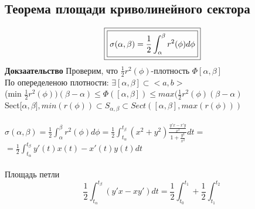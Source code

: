 \documentclass[12pt, a4paper]{article}
\begin{document}
 \subsection{Теорема площади криволинейного сектора}
 \[
    \boxed{\boxed{ \sigma(\alpha,\beta)=\frac{1}{2} \int_{\alpha}^{\beta}r^2(\phi) d\phi}}\\
\]
 \textbf{Докзаательство}
    Проверим, что $\frac{1}{2}r^2(\phi)$-плотность $\Phi[\alpha,\beta]$\\
     По опеределеною плотности: $\exists [\alpha, \beta] \subset <a,b>$ \\
    (min $\frac{1}{2}r^2(\phi))(\beta - \alpha) \leq  \Phi([\alpha,\beta])\leq max(\frac{1}{2}r^2(\phi)( \beta -    \alpha)$\\
     Sect[$ \alpha,\beta ], min(r( \phi )) \subset S_{ \alpha,\beta } \subset Sect([ \alpha,\beta ], max(r( \phi )))$\\
   \\
    $\sigma(\alpha,\beta)=\frac{1}{2} \int_{\alpha}^{\beta}r^2(\phi) d\phi = \frac{1}{2}\int_{t_\alpha}^{t_\beta}(x^2+y^2)\frac{\frac{y'x-x'y}{x^2}}{1+\frac{y^2}{x^2}}dt =$ \\
    $=\frac{1}{2}\int_{t_\alpha}^{t_\beta}y'(t)x(t)-x'(t)y(t) dt$ \\
   \\
     Площадь петли\\
   \[
    \boxed{\boxed{ \frac{1}{2} \int_{t_\alpha}^{t_\beta}( y'x-xy' ) dt = \frac{1}{2}\int_{t_0}^{t_1}+\frac{1}{2}\int_{t_1}^{t_2} }} 
    \]
    
   
\end{document}
